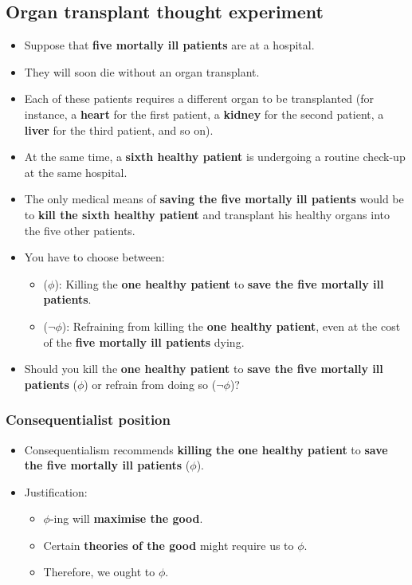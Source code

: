 \documentclass[11pt]{article}
\begin{document}
\subsection{Organ transplant thought experiment}
\label{sec:org0b412b1}
\begin{itemize}
\item Suppose that \textbf{five mortally ill patients} are at a hospital.
\item They will soon die without an organ transplant.
\item Each of these patients requires a different organ to be transplanted (for instance, a \textbf{heart} for the first patient, a \textbf{kidney} for the second patient, a \textbf{liver} for the third patient, and so on).
\item At the same time, a \textbf{sixth healthy patient} is undergoing a routine check-up at the same hospital.
\item The only medical means of \textbf{saving the five mortally ill patients} would be to \textbf{kill the sixth healthy patient} and transplant his healthy organs into the five other patients.
\item You have to choose between:
\begin{itemize}
\item (\(\phi\)): Killing the \textbf{one healthy patient} to \textbf{save the five mortally ill patients}.
\item (\(\neg \phi\)): Refraining from killing the \textbf{one healthy patient}, even at the cost of the \textbf{five mortally ill patients} dying.
\end{itemize}
\item Should you kill the \textbf{one healthy patient} to \textbf{save the five mortally ill patients} (\(\phi\)) or refrain from doing so (\(\neg \phi\))?
\end{itemize}
\subsubsection{Consequentialist position}
\label{sec:orgd7fe944}
\begin{itemize}
\item Consequentialism recommends \textbf{killing the one healthy patient} to \textbf{save the five mortally ill patients} (\(\phi\)).
\item Justification:
\begin{itemize}
\item \(\phi\)-ing will \textbf{maximise the good}.
\item Certain \textbf{theories of the good} might require us to \(\phi\).
\item Therefore, we ought to \(\phi\).
\end{itemize}
\end{itemize}
\end{document}
